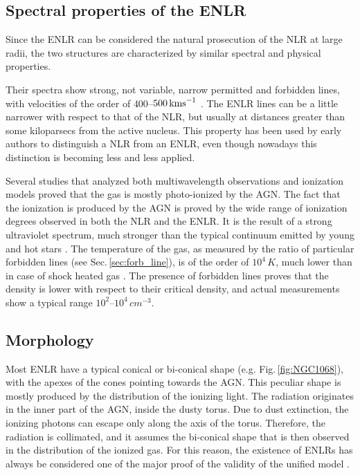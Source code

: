 \documentclass[../main.tex]{subfiles}
\begin{document}
\subsection{Spectral properties of the ENLR}

Since the ENLR can be considered the natural prosecution of the NLR at large radii, the two structures are characterized by similar spectral and physical properties.

Their spectra show strong, not variable, narrow permitted and forbidden lines, with velocities of the order of $400$--$500\,\si{\kms}$ \citep{Bennert04}. 
The ENLR lines can be a little narrower with respect to that of the NLR, but usually at distances greater than some kiloparsecs from the active nucleus.
This property has been used by early authors \citep[e.g.][]{Unger87} to distinguish a NLR from an ENLR, even though nowadays this distinction is becoming less and less applied.

Several studies that analyzed both multiwavelength observations and ionization models \citep[e.g.][]{Kraemer00,Kallman01} proved that the gas is mostly photo-ionized by the AGN.
The fact that the ionization is produced by the AGN is proved by the wide range of ionization degrees observed in both the NLR and the ENLR.
It is the result of a strong ultraviolet spectrum, much stronger than the typical continuum emitted by young and hot stars \citep{OsterbrockAGN}.
The temperature of the gas, as measured by the ratio of particular forbidden lines (see Sec.\,\ref{sec:forb_line}), is of the order of $10^4\,\si{K}$, much lower than in case of shock heated gas \citep[$T\sim 5\times10^4$ K][]{OsterbrockAGN}.
The presence of forbidden lines proves that the density is lower with respect to their critical density, and actual measurements show a typical range $10^2$--$10^4\,\si{cm^{-3}}$.

\subsection{Morphology}

Most ENLR have a typical conical or bi-conical shape (e.g. Fig.\,\ref{fig:NGC1068}), with the apexes of the cones pointing towards the AGN.
This peculiar shape is mostly produced by the distribution of the ionizing light.
The radiation originates in the inner part of the AGN, inside the dusty torus.
Due to dust extinction, the ionizing photons can escape only along the axis of the torus.
Therefore, the radiation is collimated, and it assumes the bi-conical shape that is then observed in the distribution of the ionized gas.
For this reason, the existence of ENLRs has always be considered one of the major proof of the validity of the unified model \citep{Wilson94,Schmitt03b,He18}.
\end{document}
